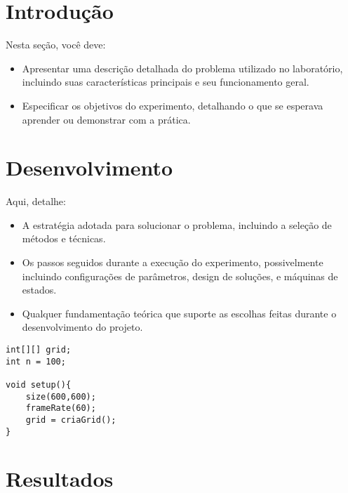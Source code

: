 \documentclass[
	12pt,				%
	oneside,			%
	a4paper,			%
	english,			%
	brazil,				%
	]{abntex2}
\begin{document}
\frenchspacing 

\imprimircapa

{
\ABNTEXchapterfont

\textual

\section{Introdução}

Nesta seção, você deve:
\begin{itemize}
    \item Apresentar uma descrição detalhada do problema utilizado no laboratório, incluindo suas características principais e seu funcionamento geral.
    \item Especificar os objetivos do experimento, detalhando o que se esperava aprender ou demonstrar com a prática.
\end{itemize}

\section{Desenvolvimento}

Aqui, detalhe:
\begin{itemize}
    \item A estratégia adotada para solucionar o problema, incluindo a seleção de métodos e técnicas.
    \item Os passos seguidos durante a execução do experimento, possivelmente incluindo configurações de parâmetros, design de soluções, e máquinas de estados.
    \item Qualquer fundamentação teórica que suporte as escolhas feitas durante o desenvolvimento do projeto.
\end{itemize}

\begin{lstlisting}
int[][] grid;
int n = 100;

void setup(){
    size(600,600);
    frameRate(60);
    grid = criaGrid();
}
\end{lstlisting}

\section{Resultados}

}
\end{document}
